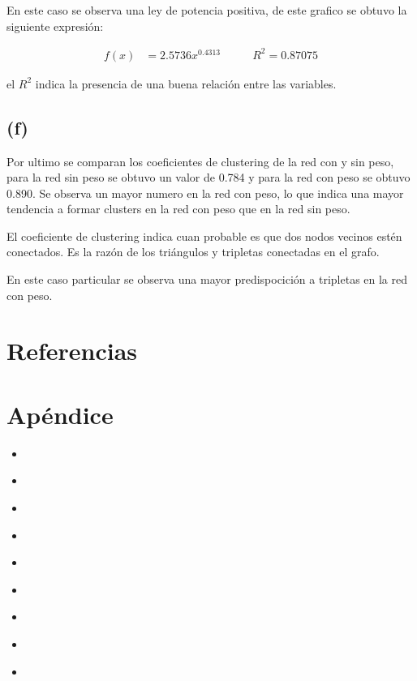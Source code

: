\documentclass[letterpaper]{article}
\newcommand{\python}[2]{
    \begin{itemize}
        \item[]
    \end{itemize}
}
\begin{document}
En este caso se observa una ley de potencia positiva, de este grafico se obtuvo la siguiente expresión:

\begin{align}
f(x) &= 2.5736x^{0.4313} & \qquad R^{2} = 0.87075
\end{align}

el $R^2$ indica la presencia de una buena relación entre las variables.

\subsection*{(f)}

Por ultimo se comparan los coeficientes de clustering de la red con y sin peso, para la red sin peso se obtuvo un valor de 0.784 y para la red con peso se obtuvo 0.890. Se observa un mayor numero en la red con peso, lo que indica una mayor tendencia a formar clusters en la red con peso que en la red sin peso.

El coeficiente de clustering indica cuan probable es que dos nodos vecinos estén conectados. Es la razón de los triángulos y tripletas conectadas en el grafo.

En este caso particular se observa una mayor predispocición a tripletas en la red con peso.


\section{Referencias}
\section{Apéndice}

\python{codigos/p1.py}{p1.py}
\python{codigos/p2.py}{p2.py}
\python{codigos/p3.py}{p3.py}
\python{codigos/p4.py}{p4.py}
\python{codigos/p5-1-gnutella.py}{p5-1-gnutella.py}
\python{codigos/p5-2-delfines.py}{p5-2-delfines.py}
\python{codigos/p5-3-erdos-renyi-gnutella.py}{p5-3-erdos-renyi-gnutella.py}
\python{codigos/p5-4-erdos-renyi-delfines.py}{p5-3-erdos-renyi-delfines.py}
\python{codigos/p9.py}{p9.py}
\end{document}
